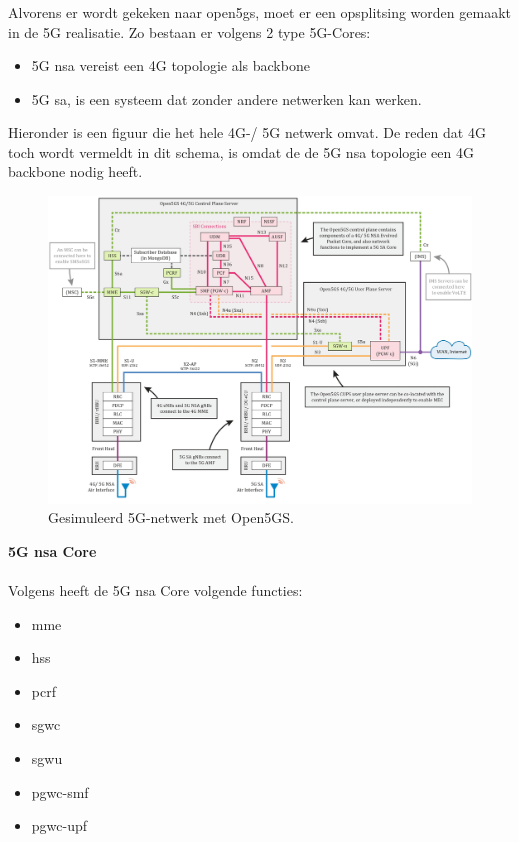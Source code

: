 \subsubsection{}
\label{sec:open5gs}

Alvorens er wordt gekeken naar \gls{open5gs}, moet er een opsplitsing worden gemaakt in de 5G realisatie.
Zo bestaan er volgens \textcite{Lee2025a} 2 type 5G-Cores:

\begin{itemize}
  \item 5G \gls{nsa} vereist een 4G topologie als backbone
  \item 5G \gls{sa}, is een systeem dat zonder andere netwerken kan werken.
\end{itemize}

Hieronder is een figuur die het hele 4G-/ 5G netwerk omvat. De reden dat 4G toch wordt vermeldt in dit schema, is omdat de de 5G \gls{nsa} topologie een 4G backbone nodig heeft. \autocite{Lee2025a}

\begin{figure}[H]
  \includegraphics[width=\linewidth]{../graphics/Open5GS-Schema.jpg}
  \caption{Gesimuleerd 5G-netwerk met Open5GS. \autocite[Door][Copyright 2021 van]{Lee2021} \textcite{Lee2021}}
  \label{fig:open5gs-schema}
\end{figure}

\textbf{5G \gls{nsa} Core}\\\\
Volgens \textcite{Lee2025a} heeft de 5G \gls{nsa} Core volgende functies:

\begin{itemize}
  \item \gls{mme}
  \item \gls{hss}
  \item \gls{pcrf}
  \item \gls{sgwc}
  \item \gls{sgwu}
  \item \gls{pgwc-smf}
  \item \gls{pgwc-upf}
\end{itemize}

